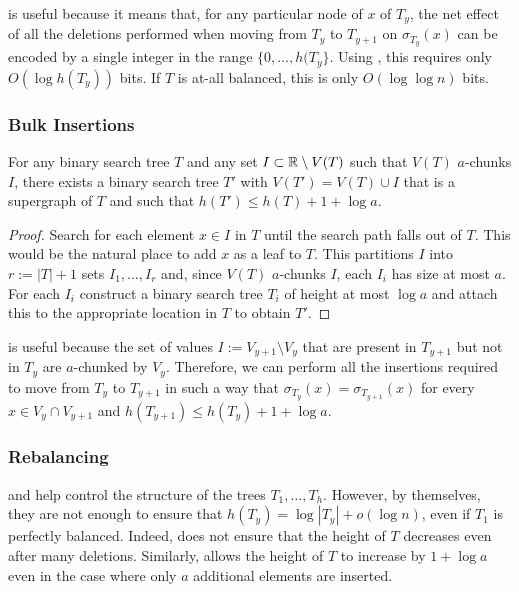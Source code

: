 \documentclass[kpfonts]{patmorin}
\begin{document}
 is useful because it means that, for any particular node of $x$ of $T_y$, the net effect of all the deletions performed when moving from $T_y$ to $T_{y+1}$ on $\sigma_{T_y}(x)$ can be encoded by a single integer in the range $\{0,\ldots,h(T_y\}$.  Using , this requires only $O(\log h(T_y))$ bits.  If $T$ is at-all balanced, this is only $O(\log\log n)$ bits.

\subsubsection{Bulk Insertions}

\begin{lem}
  For any binary search tree $T$ and any set $I\subset\mathbb{R}\setminus V(T)$ such that $V(T)$ $a$-chunks $I$, there exists a binary search tree $T'$ with $V(T')=V(T)\cup I$ that is a supergraph of $T$ and such that $h(T')\le h(T)+1+\log a$.
\end{lem}

\begin{proof}
  Search for each element $x\in I$ in $T$ until the search path falls out of $T$.  This would be the natural place to add $x$ as a leaf to $T$.  This partitions $I$ into $r:=|T|+1$ sets $I_1,\ldots,I_r$ and, since $V(T)$ $a$-chunks $I$, each $I_i$ has size at most $a$.  For each $I_i$ construct a binary search tree $T_i$ of height at most $\log a$ and attach this to the appropriate location in $T$ to obtain $T'$.
\end{proof}

 is useful because the set of values $I:=V_{y+1}\setminus V_y$ that are present in $T_{y+1}$ but not in $T_y$ are $a$-chunked by $V_y$. Therefore, we can perform all the insertions required to move from $T_y$ to $T_{y+1}$ in such a way that $\sigma_{T_y}(x)=\sigma_{T_{y+1}}(x)$ for every $x\in V_y\cap V_{y+1}$ and $h(T_{y+1})\le h(T_y)+1+\log a$.  

\subsubsection{Rebalancing}

 and  help control the structure of the trees $T_1,\ldots,T_h$.  However, by themselves, they are not enough to ensure that $h(T_y)=\log|T_y|+o(\log n)$, even if $T_1$ is perfectly balanced.  Indeed,  does not ensure that the height of $T$ decreases even after many deletions.  Similarly,  allows the height of $T$ to increase by $1+\log a$ even in the case where only $a$ additional elements are inserted.  
\end{document}
